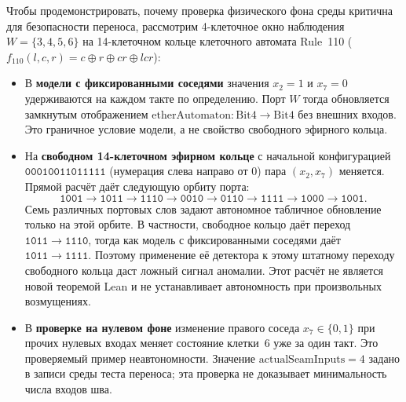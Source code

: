 \documentclass[11pt,a4paper]{article}
\theoremstyle{cleanthm}
\theoremstyle{cleandef}
\begin{document}
Чтобы продемонстрировать, почему проверка физического фона среды критична для безопасности переноса, рассмотрим 4-клеточное окно наблюдения $W=\{3,4,5,6\}$ на 14-клеточном кольце клеточного автомата Rule~110 ($f_{110}(l,c,r)=c\oplus r\oplus cr\oplus lcr$):
\begin{itemize}
  \item В \textbf{модели с фиксированными соседями} значения $x_2=1$ и $x_7=0$ удерживаются на каждом такте по определению. Порт $W$ тогда обновляется замкнутым отображением $\mathrm{etherAutomaton}:\mathrm{Bit4}\to\mathrm{Bit4}$ без внешних входов. Это граничное условие модели, а не свойство свободного эфирного кольца.
  \item На \textbf{свободном 14-клеточном эфирном кольце} с начальной конфигурацией $\mathtt{00010011011111}$ (нумерация слева направо от 0) пара $(x_2,x_7)$ меняется. Прямой расчёт даёт следующую орбиту порта:
\[
\mathtt{1001}\to\mathtt{1011}\to\mathtt{1110}\to\mathtt{0010}\to
\mathtt{0110}\to\mathtt{1111}\to\mathtt{1000}\to\mathtt{1001}.
\]
  Семь различных портовых слов задают автономное табличное обновление только на этой орбите. В частности, свободное кольцо даёт переход $\mathtt{1011}\to\mathtt{1110}$, тогда как модель с фиксированными соседями даёт $\mathtt{1011}\to\mathtt{1111}$. Поэтому применение её детектора к этому штатному переходу свободного кольца даст ложный сигнал аномалии. Этот расчёт не является новой теоремой Lean и не устанавливает автономность при произвольных возмущениях.
  \item В \textbf{проверке на нулевом фоне} изменение правого соседа $x_7\in\{0,1\}$ при прочих нулевых входах меняет состояние клетки~6 уже за один такт. Это проверяемый пример неавтономности. Значение $\mathrm{actualSeamInputs}=4$ задано в записи среды теста переноса; эта проверка не доказывает минимальность числа входов шва.
\end{itemize}
\end{document}
